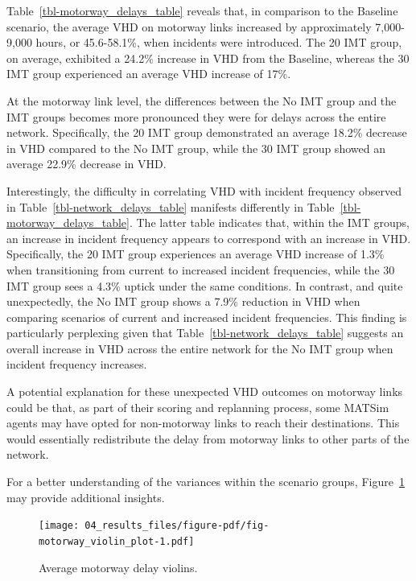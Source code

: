 \documentclass[fancy, oneside, mastersfancy, ms]{byuthesis}
\begin{document}
Table~\ref{tbl-motorway_delays_table} reveals that, in comparison to the
Baseline scenario, the average VHD on motorway links increased by
approximately 7,000-9,000 hours, or 45.6-58.1\%, when incidents were
introduced. The 20 IMT group, on average, exhibited a 24.2\% increase in
VHD from the Baseline, whereas the 30 IMT group experienced an average
VHD increase of 17\%.

At the motorway link level, the differences between the No IMT group and
the IMT groups becomes more pronounced they were for delays across the
entire network. Specifically, the 20 IMT group demonstrated an average
18.2\% decrease in VHD compared to the No IMT group, while the 30 IMT
group showed an average 22.9\% decrease in VHD.

Interestingly, the difficulty in correlating VHD with incident frequency
observed in Table~\ref{tbl-network_delays_table} manifests differently
in Table~\ref{tbl-motorway_delays_table}. The latter table indicates
that, within the IMT groups, an increase in incident frequency appears
to correspond with an increase in VHD. Specifically, the 20 IMT group
experiences an average VHD increase of 1.3\% when transitioning from
current to increased incident frequencies, while the 30 IMT group sees a
4.3\% uptick under the same conditions. In contrast, and quite
unexpectedly, the No IMT group shows a 7.9\% reduction in VHD when
comparing scenarios of current and increased incident frequencies. This
finding is particularly perplexing given that
Table~\ref{tbl-network_delays_table} suggests an overall increase in VHD
across the entire network for the No IMT group when incident frequency
increases.

A potential explanation for these unexpected VHD outcomes on motorway
links could be that, as part of their scoring and replanning process,
some MATSim agents may have opted for non-motorway links to reach their
destinations. This would essentially redistribute the delay from
motorway links to other parts of the network.

For a better understanding of the variances within the scenario groups,
Figure~\ref{fig-motorway_violin_plot} may provide additional insights.

\begin{figure}

{\centering \texttt{[image: 04\_results\_files/figure-pdf/fig-motorway\_violin\_plot-1.pdf]}

}

\caption{\label{fig-motorway_violin_plot}Average motorway delay
violins.}

\end{figure}
\end{document}
